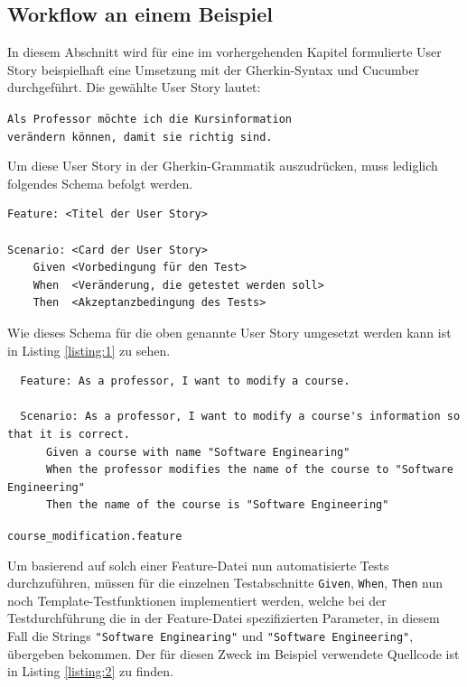 \documentclass[acmtog]{acmart}
\begin{document}
\subsection{Workflow an einem Beispiel}
In diesem Abschnitt wird für eine im vorhergehenden Kapitel formulierte User Story beispielhaft eine Umsetzung
mit der Gherkin-Syntax und Cucumber durchgeführt.
Die gewählte User Story lautet:

\texttt{Als Professor möchte ich die Kursinformation \\verändern können, damit sie richtig sind.}

Um diese User Story in der Gherkin-Grammatik auszudrücken, muss lediglich folgendes Schema befolgt werden.

\vspace*{-.3em}
\begin{verbatim}
Feature: <Titel der User Story>

Scenario: <Card der User Story>
    Given <Vorbedingung für den Test>
    When  <Veränderung, die getestet werden soll>
    Then  <Akzeptanzbedingung des Tests>
\end{verbatim}
\vspace*{-.5em}

Wie dieses Schema für die oben genannte User Story umgesetzt werden kann ist in Listing \ref{listing:1} zu sehen.

\begin{listing}[H]
  \begin{verbatim}
  Feature: As a professor, I want to modify a course.
  
  Scenario: As a professor, I want to modify a course's information so that it is correct.
      Given a course with name "Software Enginearing"
      When the professor modifies the name of the course to "Software Engineering"
      Then the name of the course is "Software Engineering"
  \end{verbatim}
  \caption{\texttt{course\_modification.feature}}
\label{listing:1}
\end{listing}

Um basierend auf solch einer Feature-Datei nun automatisierte Tests durchzuführen, müssen für die einzelnen Testabschnitte
\texttt{Given}, \texttt{When}, \texttt{Then} nun noch Template-Testfunktionen implementiert werden, welche bei der Testdurchführung
die in der Feature-Datei spezifizierten Parameter, in diesem Fall die Strings \texttt{"Software Enginearing"} und
\texttt{"Software Engineering"}, übergeben bekommen.
Der für diesen Zweck im Beispiel verwendete Quellcode ist in Listing \ref{listing:2} zu finden.
\end{document}
